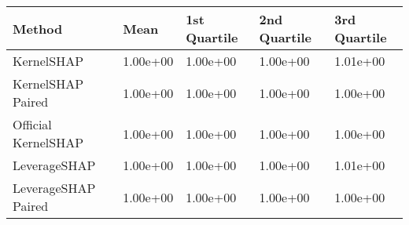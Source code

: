 \begin{tabular}{lllll}
  \toprule
  \textbf{Method} & \textbf{Mean} & \textbf{1st Quartile} & \textbf{2nd Quartile} & \textbf{3rd Quartile} \\ \midrule 
KernelSHAP & \cellcolor{gold!60}1.00e+00 & \cellcolor{gold!60}1.00e+00 & \cellcolor{gold!60}1.00e+00 & 1.01e+00\\
KernelSHAP Paired & \cellcolor{gold!60}1.00e+00 & \cellcolor{gold!60}1.00e+00 & \cellcolor{gold!60}1.00e+00 & \cellcolor{gold!60}1.00e+00\\
Official KernelSHAP & \cellcolor{gold!60}1.00e+00 & \cellcolor{gold!60}1.00e+00 & \cellcolor{gold!60}1.00e+00 & \cellcolor{gold!60}1.00e+00\\
LeverageSHAP & \cellcolor{gold!60}1.00e+00 & \cellcolor{gold!60}1.00e+00 & \cellcolor{gold!60}1.00e+00 & 1.01e+00\\
LeverageSHAP Paired & \cellcolor{gold!60}1.00e+00 & \cellcolor{gold!60}1.00e+00 & \cellcolor{gold!60}1.00e+00 & \cellcolor{gold!60}1.00e+00\\
\bottomrule
\end{tabular}